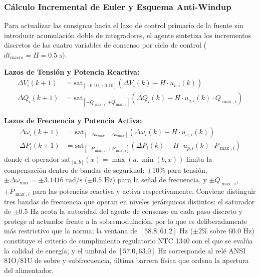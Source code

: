 \subsubsection{Cálculo Incremental de Euler y Esquema Anti-Windup}
Para actualizar las consignas hacia el lazo de control primario de la fuente sin introducir acumulación doble de integradores, el agente sintetiza los incrementos discretos de las cuatro variables de consenso por ciclo de control ($dt_{\text{macro}} = H = 0.5\text{ s}$).

\textbf{Lazos de Tensión y Potencia Reactiva:}
\begin{align*}
\Delta V_i(k+1) &= \text{sat}_{[-0.10, +0.10]}\left(\Delta V_i(k) - H \cdot u_{v, i}(k) \right)  \\
\Delta Q_i(k+1) &= \text{sat}_{[-Q_{\max, i}, +Q_{\max, i}]}\left(\Delta Q_i(k) - H \cdot u_{q, i}(k) \cdot Q_{\max, i} \right) 
\end{align*}

\textbf{Lazos de Frecuencia y Potencia Activa:}
\begin{align*}
\Delta \omega_i(k+1) &= \text{sat}_{[-\Delta\omega_{\max}, +\Delta\omega_{\max}]}\left(\Delta \omega_i(k) - H \cdot u_{\omega, i}(k) \right)  \\
\Delta P_i(k+1) &= \text{sat}_{[-P_{\max, i}, +P_{\max, i}]}\left(\Delta P_i(k) - H \cdot u_{p, i}(k) \cdot P_{\max, i} \right) 
\end{align*}
donde el operador $\text{sat}_{[a, b]}(x) = \max(a, \min(b, x))$ limita la compensación dentro de bandas de seguridad: $\pm 10\%$ para tensión, $\pm \Delta\omega_{\max} = \pm 3.1416\text{ rad/s}$ ($\pm 0.5\text{ Hz}$) para la señal de frecuencia, y $\pm Q_{\max, i}$, $\pm P_{\max, i}$ para las potencias reactiva y activa respectivamente. Conviene distinguir tres bandas de frecuencia que operan en niveles jerárquicos distintos: el saturador de $\pm 0.5\text{ Hz}$ acota la autoridad del agente de consenso en cada paso discreto y protege al actuador frente a la sobremodulación, por lo que es deliberadamente más restrictivo que la norma; la ventana de $[58.8, 61.2]\text{ Hz}$ ($\pm 2\%$ sobre $60.0\text{ Hz}$) constituye el criterio de cumplimiento regulatorio NTC 1340 con el que se evalúa la calidad de energía; y el umbral de $[57.0, 63.0]\text{ Hz}$ corresponde al relé ANSI 81O/81U de sobre y subfrecuencia, última barrera física que ordena la apertura del alimentador.

